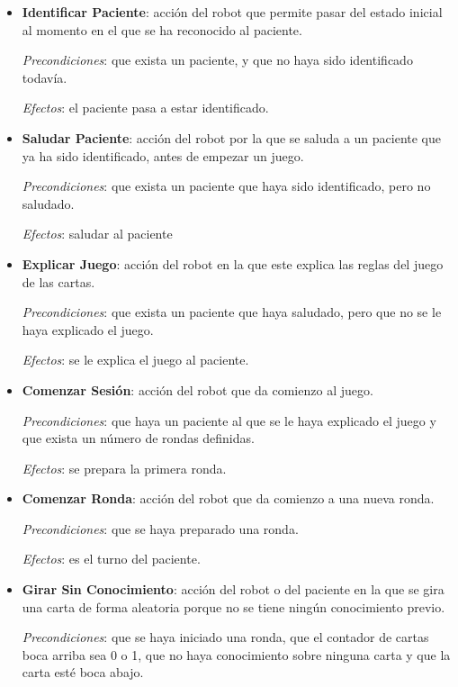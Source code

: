 \documentclass{uc3mpracticas}
\begin{document}
  \begin{itemize}
    \item \textbf{Identificar Paciente}: acción del robot que permite pasar del estado inicial al momento en el que se ha reconocido al paciente.

      \textit{Precondiciones}: que exista un paciente, y que no haya sido identificado todavía.

      \textit{Efectos}: el paciente pasa a estar identificado.

    \item \textbf{Saludar Paciente}: acción del robot por la que se saluda a un paciente que ya ha sido identificado, antes de empezar un juego.

      \textit{Precondiciones}: que exista un paciente que haya sido identificado, pero no saludado.

      \textit{Efectos}: saludar al paciente

    \item \textbf{Explicar Juego}: acción del robot en la que este explica las reglas del juego de las cartas.

      \textit{Precondiciones}: que exista un paciente que haya saludado, pero que no se le haya explicado el juego.

      \textit{Efectos}: se le explica el juego al paciente.

    \item \textbf{Comenzar Sesión}: acción del robot que da comienzo al juego.

      \textit{Precondiciones}: que haya un paciente al que se le haya explicado el juego y que exista un número de rondas definidas.

      \textit{Efectos}: se prepara la primera ronda.

    \item \textbf{Comenzar Ronda}: acción del robot que da comienzo a una nueva ronda.

      \textit{Precondiciones}: que se haya preparado una ronda.

      \textit{Efectos}: es el turno del paciente.

    \item \textbf{Girar Sin Conocimiento}: acción del robot o del paciente en la que se gira una carta de forma aleatoria porque no se tiene ningún conocimiento previo.

      \textit{Precondiciones}: que se haya iniciado una ronda, que el contador de cartas boca arriba sea 0 o 1, que no haya conocimiento sobre ninguna carta y que la carta esté boca abajo.


\end{itemize}
\end{document}
